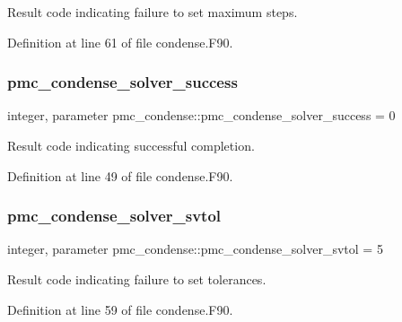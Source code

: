 Result code indicating failure to set maximum steps. 



Definition at line 61 of file condense.\+F90.

\mbox{\label{namespacepmc__condense_ae609c2a0547a2fc09bb22c5e05eaee80}} 
\subsubsection{\texorpdfstring{pmc\+\_\+condense\+\_\+solver\+\_\+success}{pmc\_condense\_solver\_success}}
{\footnotesize\ttfamily integer, parameter pmc\+\_\+condense\+::pmc\+\_\+condense\+\_\+solver\+\_\+success = 0}



Result code indicating successful completion. 



Definition at line 49 of file condense.\+F90.

\mbox{\label{namespacepmc__condense_a728628df918109b721d5ac51252ee397}} 
\subsubsection{\texorpdfstring{pmc\+\_\+condense\+\_\+solver\+\_\+svtol}{pmc\_condense\_solver\_svtol}}
{\footnotesize\ttfamily integer, parameter pmc\+\_\+condense\+::pmc\+\_\+condense\+\_\+solver\+\_\+svtol = 5}



Result code indicating failure to set tolerances. 



Definition at line 59 of file condense.\+F90.

